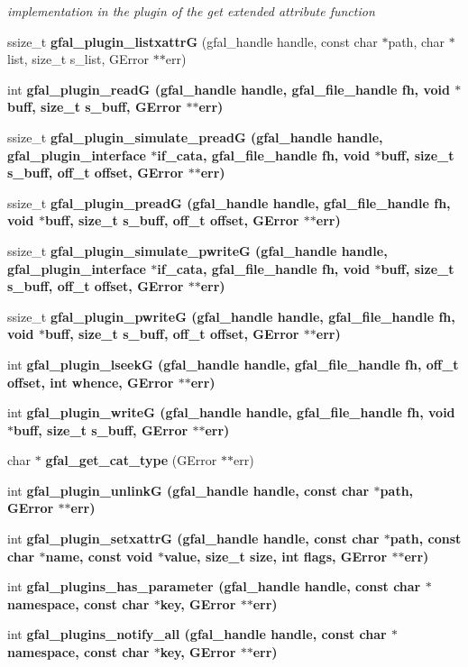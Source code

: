 \begin{CompactItemize}
\begin{CompactList}\small\item\em implementation in the plugin of the get extended attribute function \item\end{CompactList}\item 
ssize\_\-t \textbf{gfal\_\-plugin\_\-listxattr\-G} (gfal\_\-handle handle, const char $\ast$path, char $\ast$list, size\_\-t s\_\-list, GError $\ast$$\ast$err)\label{gfal__common__plugin_8c_ef696550c6ac4bab6dec58d7c857b3f4}

\item 
int \bf{gfal\_\-plugin\_\-read\-G} (gfal\_\-handle handle, gfal\_\-file\_\-handle fh, void $\ast$buff, size\_\-t s\_\-buff, GError $\ast$$\ast$err)
\item 
ssize\_\-t \bf{gfal\_\-plugin\_\-simulate\_\-pread\-G} (gfal\_\-handle handle, \bf{gfal\_\-plugin\_\-interface} $\ast$if\_\-cata, gfal\_\-file\_\-handle fh, void $\ast$buff, size\_\-t s\_\-buff, off\_\-t offset, GError $\ast$$\ast$err)
\item 
ssize\_\-t \bf{gfal\_\-plugin\_\-pread\-G} (gfal\_\-handle handle, gfal\_\-file\_\-handle fh, void $\ast$buff, size\_\-t s\_\-buff, off\_\-t offset, GError $\ast$$\ast$err)
\item 
ssize\_\-t \bf{gfal\_\-plugin\_\-simulate\_\-pwrite\-G} (gfal\_\-handle handle, \bf{gfal\_\-plugin\_\-interface} $\ast$if\_\-cata, gfal\_\-file\_\-handle fh, void $\ast$buff, size\_\-t s\_\-buff, off\_\-t offset, GError $\ast$$\ast$err)
\item 
ssize\_\-t \bf{gfal\_\-plugin\_\-pwrite\-G} (gfal\_\-handle handle, gfal\_\-file\_\-handle fh, void $\ast$buff, size\_\-t s\_\-buff, off\_\-t offset, GError $\ast$$\ast$err)
\item 
int \bf{gfal\_\-plugin\_\-lseek\-G} (gfal\_\-handle handle, gfal\_\-file\_\-handle fh, off\_\-t offset, int whence, GError $\ast$$\ast$err)
\item 
int \bf{gfal\_\-plugin\_\-write\-G} (gfal\_\-handle handle, gfal\_\-file\_\-handle fh, void $\ast$buff, size\_\-t s\_\-buff, GError $\ast$$\ast$err)
\item 
char $\ast$ \textbf{gfal\_\-get\_\-cat\_\-type} (GError $\ast$$\ast$err)\label{gfal__common__plugin_8c_c20aa1a376c802d0c60208854537851e}

\item 
int \bf{gfal\_\-plugin\_\-unlink\-G} (gfal\_\-handle handle, const char $\ast$path, GError $\ast$$\ast$err)
\item 
int \bf{gfal\_\-plugin\_\-setxattr\-G} (gfal\_\-handle handle, const char $\ast$path, const char $\ast$name, const void $\ast$value, size\_\-t size, int flags, GError $\ast$$\ast$err)
\item 
int \bf{gfal\_\-plugins\_\-has\_\-parameter} (gfal\_\-handle handle, const char $\ast$namespace, const char $\ast$key, GError $\ast$$\ast$err)
\item 
int \bf{gfal\_\-plugins\_\-notify\_\-all} (gfal\_\-handle handle, const char $\ast$namespace, const char $\ast$key, GError $\ast$$\ast$err)
\end{CompactItemize}


